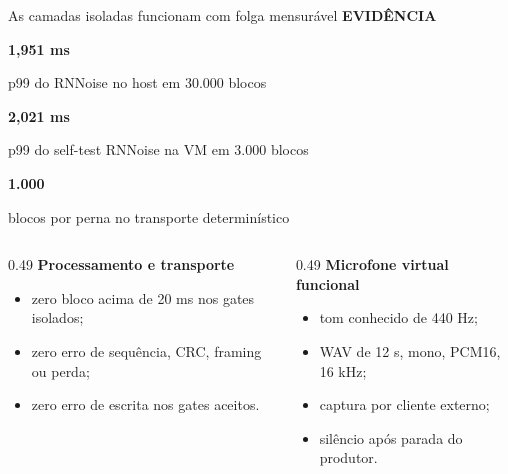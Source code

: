 \documentclass[aspectratio=169,10pt]{beamer}
\newcommand{\kicker}[1]{%
    {\color{signalorange}\scriptsize\bfseries\MakeUppercase{#1}}\par\vspace{0.08cm}
}
\newcommand{\metric}[2]{%
    \begin{minipage}[t]{0.29\textwidth}
        {\color{uspblue}\LARGE\bfseries #1\par}
        \vspace{0.04cm}
        {\scriptsize #2\par}
    \end{minipage}
}
\begin{document}
\begin{frame}{As camadas isoladas funcionam com folga mensurável}
    \kicker{Evidência}
    \centering
    \metric{1,951 ms}{p99 do RNNoise no host em 30.000 blocos}
    \hfill
    \metric{2,021 ms}{p99 do self-test RNNoise na VM em 3.000 blocos}
    \hfill
    \metric{1.000}{blocos por perna no transporte determinístico}

    \vspace{0.55cm}
    \begin{columns}[T,onlytextwidth]
        \begin{column}{0.49\textwidth}
            \textbf{Processamento e transporte}
            \begin{itemize}
                \item zero bloco acima de 20 ms nos gates isolados;
                \item zero erro de sequência, CRC, framing ou perda;
                \item zero erro de escrita nos gates aceitos.
            \end{itemize}
        \end{column}
        \begin{column}{0.49\textwidth}
            \textbf{Microfone virtual funcional}
            \begin{itemize}
                \item tom conhecido de 440 Hz;
                \item WAV de 12 s, mono, PCM16, 16 kHz;
                \item captura por cliente externo;
                \item silêncio após parada do produtor.
            \end{itemize}
        \end{column}
    \end{columns}
\end{frame}
\end{document}
